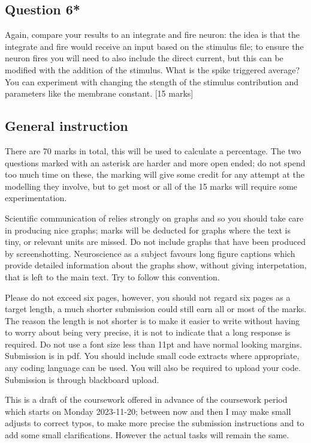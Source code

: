 \documentclass[12pt]{article}
\begin{document}
\subsection*{Question 6*} 

Again, compare your results to an integrate and fire neuron: the idea
is that the integrate and fire would receive an input based on the
stimulus file; to ensure the neuron fires you will need to also
include the direct current, but this can be modified with the addition
of the stimulus. What is the spike triggered average? You can
experiment with changing the stength of the stimulus contribution and
parameters like the membrane constant. [15 marks]

\subsection*{General instruction}

There are 70 marks in total, this will be used to calculate a
percentage. The two questions marked with an asterisk are harder and
more open ended; do not spend too much time on these, the marking will
give some credit for any attempt at the modelling they involve, but to
get most or all of the 15 marks will require some experimentation.

Scientific communication of relies strongly on graphs and so you
should take care in producing nice graphs; marks will be deducted for
graphs where the text is tiny, or relevant units are missed. Do not
include graphs that have been produced by screenshotting.
Neuroscience as a subject favours long figure captions which provide
detailed information about the graphs show, without giving
interpetation, that is left to the main text. Try to follow this
convention.

Please do not exceed six pages, however, you should not regard six
pages as a target length, a much shorter submission could still earn
all or most of the marks. The reason the length is not shorter is to
make it easier to write without having to worry about being very
precise, it is not to indicate that a long response is required. Do
not use a font size less than 11pt and have normal looking
margins. Submission is in pdf. You should include small code extracts
where appropriate, any coding language can be used. You will also be
required to upload your code. Submission is through blackboard upload.

This is a draft of the coursework offered in advance of the coursework
period which starts on Monday 2023-11-20; between now and then I may
make small adjusts to correct typos, to make more precise the
submission instructions and to add some small clarifications. However
the actual tasks will remain the same.
\end{document}
